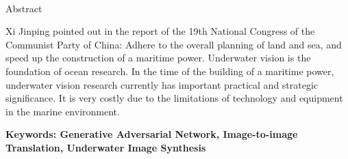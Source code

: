 \newpage

\begin{center}
  {\sanhao[1.5]\heiti\oucetitle\\\vskip7pt Abstract}
\end{center}
{\normalsize\songti

Xi Jinping pointed out in the report of the 19th National Congress of the Communist Party of China: Adhere to the overall planning of land and sea, and speed up the construction of a maritime power. Underwater vision is the foundation of ocean research. In the time of the building of a maritime power, underwater vision research currently has important practical and strategic significance. It is very costly due to the limitations of technology and equipment in the marine environment.


}
 
\vskip12bp
{\xiaosi\heiti\noindent 
\textbf{Keywords: Generative Adversarial Network, Image-to-image Translation, Underwater Image Synthesis}}
